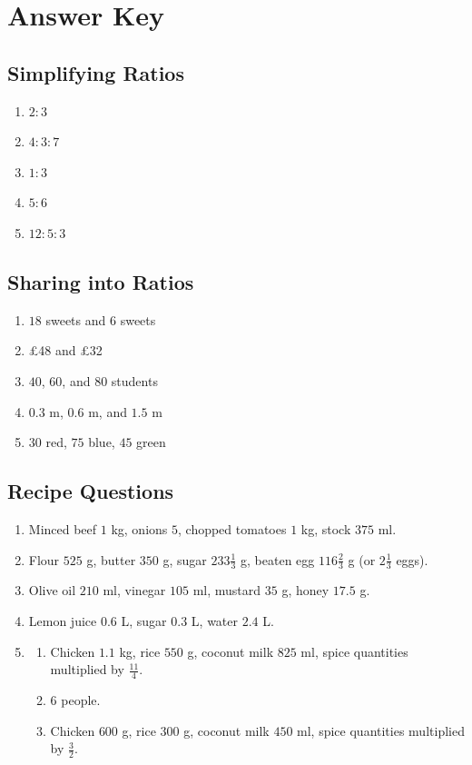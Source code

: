 \documentclass[12pt,a4paper]{article}
\begin{document}
\section*{Answer Key}

\subsection*{Simplifying Ratios}
\begin{enumerate}
\item \(2:3\)
\item \(4:3:7\)
\item \(1:3\)
\item \(5:6\)
\item \(12:5:3\)
\end{enumerate}

\subsection*{Sharing into Ratios}
\begin{enumerate}
\item \(18\) sweets and \(6\) sweets
\item \pounds48 and \pounds32
\item \(40\), \(60\), and \(80\) students
\item \(0.3\) m, \(0.6\) m, and \(1.5\) m
\item \(30\) red, \(75\) blue, \(45\) green
\end{enumerate}

\subsection*{Recipe Questions}
\begin{enumerate}
\item Minced beef \(1\) kg, onions \(5\), chopped tomatoes \(1\) kg, stock \(375\) ml.
\item Flour \(525\) g, butter \(350\) g, sugar \(233\frac13\) g, beaten egg \(116\frac23\) g (or \(2\frac13\) eggs).
\item Olive oil \(210\) ml, vinegar \(105\) ml, mustard \(35\) g, honey \(17.5\) g.
\item Lemon juice \(0.6\) L, sugar \(0.3\) L, water \(2.4\) L.
\item \begin{enumerate}[label=(\alph*)]
\item Chicken \(1.1\) kg, rice \(550\) g, coconut milk \(825\) ml, spice quantities multiplied by \(\frac{11}{4}\).
\item \(6\) people.
\item Chicken \(600\) g, rice \(300\) g, coconut milk \(450\) ml, spice quantities multiplied by \(\frac32\).
\end{enumerate}
\end{enumerate}
\end{document}
